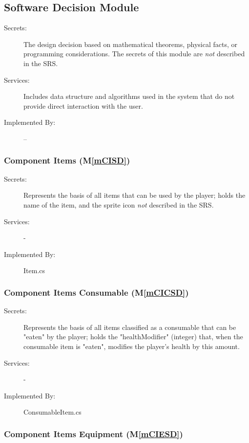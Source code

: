 \documentclass[12pt, titlepage]{article}
\newcommand{\mref}[1]{M\ref{#1}}
\begin{document}
\subsection{Software Decision Module}

\begin{description}
\item[Secrets:] The design decision based on mathematical theorems, physical
  facts, or programming considerations. The secrets of this module are
  \emph{not} described in the SRS.
\item[Services:] Includes data structure and algorithms used in the system that
  do not provide direct interaction with the user. 
\item[Implemented By:] --
\end{description}

\subsubsection{Component Items (\mref{mCISD})}

\begin{description}
\item[Secrets:] Represents the basis of all items that can be used by the player; holds the name of the item, and the sprite icon
  \emph{not} described in the SRS.
\item[Services:] -
\item[Implemented By:] Item.cs
\end{description}

\subsubsection{Component Items Consumable (\mref{mCICSD})}

\begin{description}
\item[Secrets:] Represents the basis of all items classified as a consumable that can be "eaten" by the player; holds the "healthModifier" (integer) that, when the consumable item is "eaten", modifies the player's health by this amount.
\item[Services:] -
\item[Implemented By:] ConsumableItem.cs
\end{description}

\subsubsection{Component Items Equipment (\mref{mCIESD})}
\end{document}
